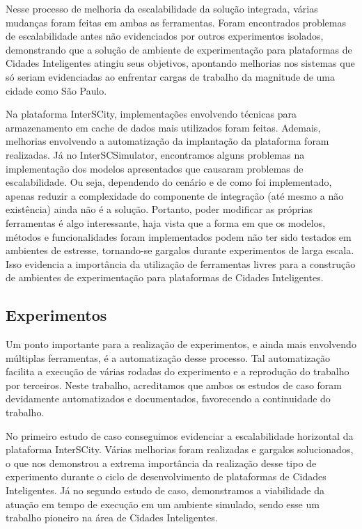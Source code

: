 Nesse processo de melhoria da escalabilidade da solução integrada, várias mudanças foram feitas em ambas as ferramentas.
Foram encontrados problemas de escalabilidade antes não evidenciados por outros experimentos isolados, demonstrando que a solução de ambiente de experimentação para
plataformas de Cidades Inteligentes atingiu seus objetivos, apontando melhorias nos sistemas que só seriam evidenciadas ao enfrentar cargas de trabalho da magnitude de uma
cidade como São Paulo.

Na plataforma InterSCity, implementações envolvendo técnicas para armazenamento em cache de dados mais utilizados foram feitas.
Ademais, melhorias envolvendo a automatização da implantação da plataforma foram realizadas.
Já no InterSCSimulator, encontramos alguns problemas na implementação dos modelos apresentados que causaram problemas de escalabilidade.
Ou seja, dependendo do cenário e de como foi implementado, apenas reduzir a complexidade do componente de integração (até mesmo a não existência) ainda não é a solução.
Portanto, poder modificar as próprias ferramentas é algo interessante, haja vista que a forma em que os modelos, métodos e funcionalidades foram implementados podem não
ter sido testados em ambientes de estresse, tornando-se gargalos durante experimentos de larga escala.
Isso evidencia a importância da utilização de ferramentas livres para a construção de ambientes de experimentação para plataformas de Cidades Inteligentes.


\subsection{Experimentos}

Um ponto importante para a realização de experimentos, e ainda mais envolvendo múltiplas ferramentas, é a automatização desse processo.
Tal automatização facilita a execução de várias rodadas do experimento e a reprodução do trabalho por terceiros.
Neste trabalho, acreditamos que ambos os estudos de caso foram devidamente automatizados e documentados, favorecendo a continuidade do trabalho.

No primeiro estudo de caso conseguimos evidenciar a escalabilidade horizontal da plataforma InterSCity.
Várias melhorias foram realizadas e gargalos solucionados, o que nos demonstrou a extrema importância da realização desse tipo de experimento durante o ciclo de desenvolvimento de plataformas de Cidades
Inteligentes.
Já no segundo estudo de caso, demonstramos a viabilidade da atuação em tempo de execução em um ambiente simulado, sendo esse um trabalho pioneiro na área de Cidades Inteligentes.
 
